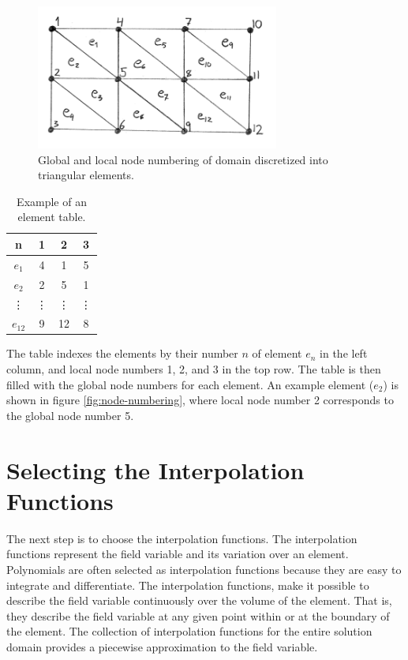 \begin{figure}
  \centering
  \includegraphics[width=8cm]{./images/finite_element_method_node_numbering.png}
\caption{Global and local node numbering of domain discretized into
  triangular elements.}
\label{fig:node-numbering}
\end{figure}

\begin{table}
  \centering
\begin{tabular}{c|c|c|c|}
n & 1 & 2 & 3 \\
\hline
$e_1$ & 4 & 1 & 5 \\
$e_2$ & 2 & 5 & 1 \\
\vdots & \vdots & \vdots & \vdots \\
$e_{12}$ & 9 & 12 & 8 \\
\hline
\end{tabular}
\caption{Example of an element table.}
\label{table:element-table}
\end{table}

The table indexes the elements by their number $n$ of element $e_n$
in the left column, and local node numbers 1, 2, and 3 in the top
row. The table is then filled with the global node numbers for each
element. An example element ($e_2$) is shown in figure
\vref{fig:node-numbering}, where local node number 2 corresponds to the
global node number 5. 

\section{Selecting the Interpolation Functions}
\label{sec:selecting_interpolation_function}
The next step is to choose the interpolation functions. The
interpolation functions represent the field variable and its
variation over an element. Polynomials are often selected as
interpolation functions because they are easy to integrate and
differentiate.
%
The interpolation functions, make it possible to describe the field
variable continuously over the volume of the element. That is, they
describe the field variable at any given point within or at the
boundary of the element.
%
The collection of interpolation functions for the entire solution
domain provides a piecewise approximation to the field variable.


